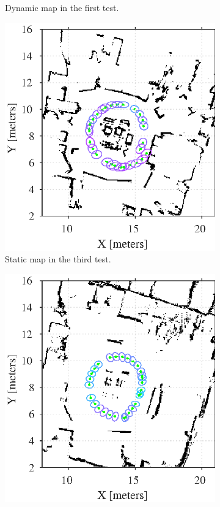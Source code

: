 \begin{figure}[htbp]
\begin{subfigure}[t]{0.45\linewidth}
       	\caption{Dynamic map in the first test.}
    \end{subfigure}
   	\begin{subfigure}[t]{0.45\linewidth}
        \includegraphics[width=1\linewidth]{chapters/evaluation/figures/localization_static_map3}	
        \caption{Static map in the third test.}
    \end{subfigure}
    \hspace{2mm}
   	\begin{subfigure}[t]{0.45\linewidth}
        \includegraphics[width=\linewidth]{chapters/evaluation/figures/localization_dynamic_map3}

\end{subfigure}
\end{figure}
